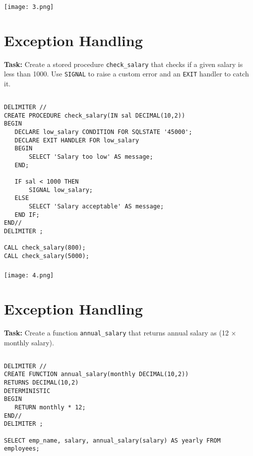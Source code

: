 \documentclass[12pt, a4paper]{article}
\begin{document}
\subsubsection{}
\begin{center}
    \texttt{[image: 3.png]}
\end{center}

\section{Exception Handling}
\textbf{Task:} Create a stored procedure \texttt{check\_salary} that checks if a given salary 
is less than 1000. Use \texttt{SIGNAL} to raise a custom error and an \texttt{EXIT} handler to catch it.

\subsection{}
\begin{lstlisting}
DELIMITER //
CREATE PROCEDURE check_salary(IN sal DECIMAL(10,2))
BEGIN
   DECLARE low_salary CONDITION FOR SQLSTATE '45000';
   DECLARE EXIT HANDLER FOR low_salary
   BEGIN
       SELECT 'Salary too low' AS message;
   END;

   IF sal < 1000 THEN
       SIGNAL low_salary;
   ELSE
       SELECT 'Salary acceptable' AS message;
   END IF;
END//
DELIMITER ;

CALL check_salary(800);
CALL check_salary(5000);
\end{lstlisting}

\subsubsection{}
\begin{center}
    \texttt{[image: 4.png]}
\end{center}

\section{Exception Handling}
\textbf{Task:} Create a function \texttt{annual\_salary} that returns annual salary as (12 × monthly salary).

\subsection{}
\begin{lstlisting}
DELIMITER //
CREATE FUNCTION annual_salary(monthly DECIMAL(10,2))
RETURNS DECIMAL(10,2)
DETERMINISTIC
BEGIN
   RETURN monthly * 12;
END//
DELIMITER ;

SELECT emp_name, salary, annual_salary(salary) AS yearly FROM employees;

\end{lstlisting}
\end{document}
